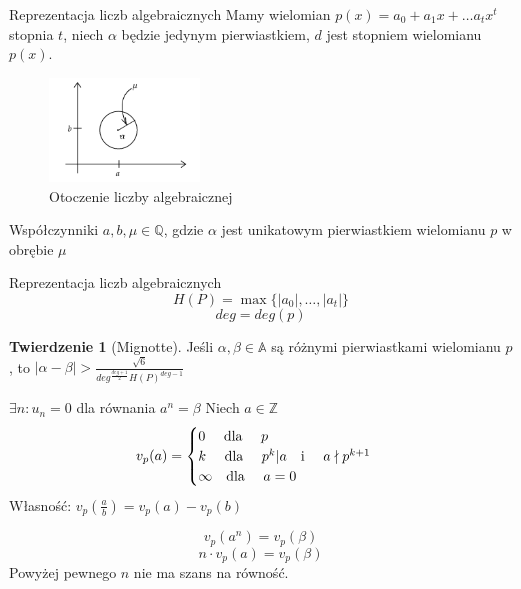 \documentclass[handout]{beamer}
\def\Z{\mathbb Z}
\def\A{\mathbb{A}}
\theoremstyle{definition}
\newtheorem*{definicja}{Definicja}
\newtheorem*{twierdzenie}{Twierdzenie}
\theoremstyle{named}
\begin{document}
\begin{frame}{Reprezentacja liczb algebraicznych }
    Mamy wielomian $p(x) = a_0 + a_1 x + \ldots a_{t} x^{t}$ stopnia $t$, niech $\alpha$ będzie jedynym pierwiastkiem, $d$ jest stopniem wielomianu $p(x)$. \pause 
    \begin{figure}
        \centering
        \includegraphics[width=40mm]{img/reprez-skolem.png}
        \caption{Otoczenie liczby algebraicznej}
    \end{figure}
    \pause 
    Współczynniki $a, b,  \mu \in \mathbb{Q}$, gdzie $\alpha$ jest unikatowym pierwiastkiem wielomianu $p$ w obrębie $\mu$
\end{frame}

\begin{frame}{Reprezentacja liczb algebraicznych}
    $$H(P) = \max \{ |a_0|, \ldots, |a_t| \}$$
    $$ deg = deg(p) $$
    \begin{twierdzenie}[Mignotte]
            Jeśli $\alpha, \beta \in \A$ są różnymi pierwiastkami wielomianu $p$, to 
            $|\alpha - \beta| > \frac{\sqrt{6}}{deg^{\frac{deg+1}{2}} H(P)^{deg-1}}$
    \end{twierdzenie}
\end{frame}



\begin{frame}{$\exists n: u_n = 0$ dla równania $a^{n} = \beta$}
Niech $a \in \mathbb{Z}$
\begin{equation}
v_p(a)= 
    \begin{cases}
        0 \text{ \quad dla \quad } p \\
        k \text{ \quad dla \quad } p^{k} | a  \text{\quad i \quad } a \nmid p^{k+1} \\
        \infty \text{\quad dla \quad} a= 0
    \end{cases}
\end{equation}
Własność:
$v_p(\frac{a}{b}) = v_p(a) - v_p(b)$


\[
    v_{p}(a^{n}) = v_p(\beta) 
\]
\[
    n \cdot v_{p}(a) = v_{p}(\beta)
\]
\pause 
Powyżej pewnego $n$ nie ma szans na równość.

\end{frame}
\end{document}
